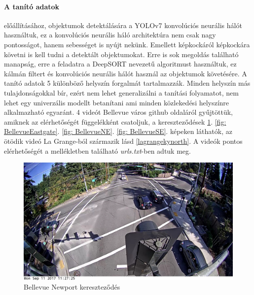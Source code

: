 \documentclass[acmtog, authorversion]{acmart}
\begin{document}
\paragraph{A tanító adatok} előállításához, objektumok detektálására a YOLOv7 \cite{wang2022yolov7} konvolúciós neurális hálót használtuk, ez a konvolúciós neurális háló architektúra nem csak nagy pontosságot, hanem sebességet is nyújt nekünk. 
Emellett képkockáról képkockára követni is kell tudni a detektált objektumokat. Erre is sok megoldás található manapság, erre a feladatra
a DeepSORT \cite{Wojke2018deep} nevezetű algoritmust használtuk, ez kálmán filtert és konvolúciós neurális hálót használ az objektumok követésére.
A tanító adatok 5 különböző helyszín forgalmát tartalmazzák. Minden helyszín más tulajdonságokkal bír, ezért nem lehet generalizálni
a tanítási folyamatot, nem lehet egy univerzális modellt betanítani ami minden közlekedési helyszínre alkalmazható egyaránt.
4 videót Bellevue város github oldaláról gyűjtöttük, amiknek az elérhetőségét függelékként csatoljuk, a kereszteződések 
\ref{fig: BellevueNewport}. \ref{fig: BellevueEastgate}. \ref{fig: BellevueNE}. \ref{fig: BellevueSE}. képeken láthatók, az ötödik videó La Grange-ból származik lásd \ref{lagrangekynorth}. A videók pontos elérhetőségét
a mellékletben található \emph{urls.txt}-ben adtuk meg.
\begin{figure}
    \includegraphics[width=1\columnwidth]{dataset_samples/Bellevue_150th_Newport.JPG}
    \caption{Bellevue Newport kereszteződés}
    \label{fig: BellevueNewport}
\end{figure}
\end{document}
